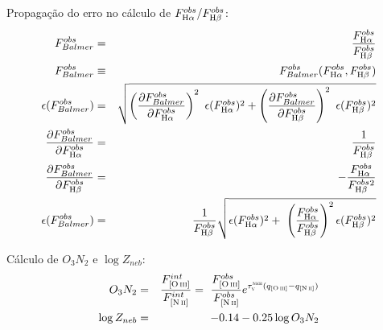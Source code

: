 \documentclass[a4paper,12pt]{article}
\newcommand{\tauVN}{\tau_{\mathrm{\textsc{v}}}^{\mathrm{\textsc{neb}}}}
\newcommand{\Halpha}{\ifmmode \mathrm{H}\alpha \else H$\alpha$\xspace \fi}
\newcommand{\Hbeta}{\ifmmode \mathrm{H}\beta \else H$\beta$\xspace \fi}
\newcommand{\nII}{\ifmmode [\mathrm{N\,\textsc{ii}}] \else [N\thinspace\textsc{ii}]\xspace \fi}
\newcommand{\oIII}{\ifmmode [\mathrm{O\,\textsc{iii}}] \else [O\thinspace{\sc iii}]\xspace \fi}
\newcommand{\del}[2]{\frac{\partial #1}{\partial #2}}
\begin{document}
Propagação do erro no cálculo de $F_{\Halpha}^{obs} / F_{\Hbeta}^{obs}$:
\begin{eqnarray}
	F_{Balmer}^{obs} &=& \frac{F_{\Halpha}^{obs}}{F_{\Hbeta}^{obs}} \\
	F_{Balmer}^{obs} &\equiv& F_{Balmer}^{obs}(F_{\Halpha}^{obs}, F_{\Hbeta}^{obs}) \\
	\epsilon(F_{Balmer}^{obs}) &=& \sqrt{\left(\del{F_{Balmer}^{obs}}{F_{\Halpha}^{obs}}\right)^2 \
\epsilon(F_{\Halpha}^{obs})^2 + \left(\del{F_{Balmer}^{obs}}{F_{\Hbeta}^{obs}}\right)^2 \
\epsilon(F_{\Hbeta}^{obs})^2} \\
	\del{F_{Balmer}^{obs}}{F_{\Halpha}^{obs}} &=& \frac{1}{F_{\Hbeta}^{obs}} \\
	\del{F_{Balmer}^{obs}}{F_{\Hbeta}^{obs}} &=& - \frac{F_{\Halpha}^{obs}}{F_{\Hbeta}^{obs}{}^2} \\
	\epsilon(F_{Balmer}^{obs}) &=& \frac{1}{F_{\Hbeta}^{obs}} \sqrt{\epsilon(F_{\Halpha}^{obs})^2 + \
\left(\frac{F_{\Halpha}^{obs}}{F_{\Hbeta}^{obs}}\right)^2 \epsilon(F_{\Hbeta}^{obs})^2} 
\end{eqnarray}

Cálculo de $O_3N_2$ e $\log Z_{neb}$:
\begin{eqnarray}
	O_3N_2 &=& \frac{F_{\oIII}^{int}}{F_{\nII}^{int}} = \
\frac{F_{\oIII}^{obs}}{F_{\nII}^{obs}} e^{\tauVN (q_{\oIII} - q_{\nII})} \\
	\log Z_{neb} &=& - 0.14 - 0.25 \log O_3N_2 \\
\end{eqnarray}
\end{document}
